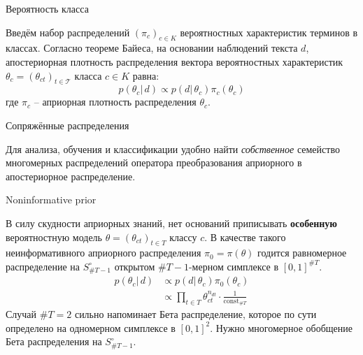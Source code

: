 \documentclass{beamer}
\newcommand{\eng}[1]{\foreignlanguage{english}{#1}}
\newcommand{\clo}[1]{\left [ #1 \right ]}
\newcommand{\brac}[1]{\left ( #1 \right )}
\newcommand{\induc}[1]{\left . #1 \right \vert}
\newcommand{\Tcal}{\mathcal{T}}
\begin{document}
\begin{frame}
  \begin{block}{Вероятность класса}

    Введём набор распределений $\brac{\pi_c}_{c\in K}$ вероятностных характеристик терминов в классах.
    Согласно теореме Байеса, на основании наблюдений текста $d$, апостериорная плотность распределения вектора вероятностных характеристик $\theta_c = \brac{\theta_{ct}}_{t\in \Tcal}$ класса $c\in K$ равна:
      \[p\brac{\induc{\theta_c}\,d} \propto p\brac{\induc{d}\,\theta_c}\pi_c(\theta_c)\]
    где $\pi_c$ -- априорная плотность распределения $\theta_c$.
  \end{block}
  \begin{block}{Сопряжённые распределения}

    Для анализа, обучения и классификации удобно найти \emph{собственное} семейство многомерных распределений оператора преобразования априорного в апостериорное распределение.
  \end{block}
\end{frame}

\begin{frame}
  \begin{block}{\eng{Noninformative prior}}

    В силу скудности априорных знаний, нет оснований приписывать \textbf{особенную} вероятностную модель $\theta = \brac{\theta_{ct}}_{t\in T}$ классу $c$.
    В качестве такого неинформативного априорного распределения $\pi_0=\pi(\theta)$ годится равномерное распределение на $S_{\#T-1}^\circ$ открытом $\#T-1$-мерном симплексе в $\clo{0,1}^{\#T}$.
    \begin{align*}
      p\brac{\induc{\theta_c}\,d} & \propto p\brac{\induc{d}\,\theta_c}\pi_0(\theta_c) \\
        & \propto \prod_{t\in T}\theta_{ct}^{n_{dt}} \cdot \frac{1}{\text{const}_{\#T}}
    \end{align*}
    Случай $\#T=2$ сильно напоминает Бета распределение, которое по сути определено на одномерном симплексе в $\clo{0,1}^2$.
    Нужно многомерное обобщение Бета распределения на $S_{\#T-1}^\circ$.
  \end{block}
\end{frame}

\end{document}
